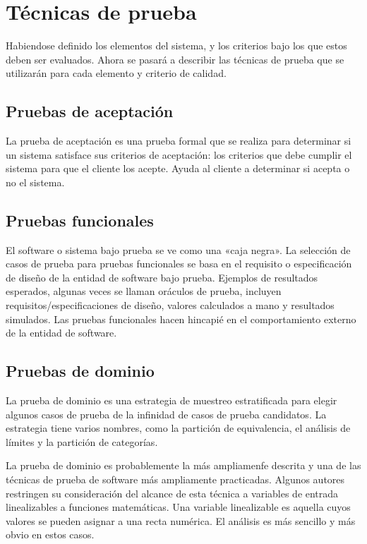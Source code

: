 \section{Técnicas de prueba}
Habiendose definido los elementos del sistema, y los criterios bajo los que
estos deben ser evaluados. Ahora se pasará a describir las técnicas de prueba
que se utilizarán para cada elemento y criterio de calidad.

\subsection{Pruebas de aceptación}
La prueba de aceptación es una prueba formal que se realiza para determinar si
un sistema satisface sus criterios de aceptación: los criterios que debe cumplir
el sistema para que el cliente los acepte. Ayuda al cliente a determinar si
acepta o no el sistema\cite{Naik}.

\subsection{Pruebas funcionales}
El software o sistema bajo prueba se ve como una «caja negra». La selección de
casos de prueba para pruebas funcionales se basa en el requisito o
especificación de diseño de la entidad de software bajo prueba. Ejemplos de
resultados esperados, algunas veces se llaman oráculos de prueba, incluyen
requisitos/especificaciones de diseño, valores calculados a mano y resultados
simulados. Las pruebas funcionales hacen hincapié en el comportamiento externo
de la entidad de software\cite{Luo}.

\subsection{Pruebas de dominio}
La prueba de dominio es una estrategia de muestreo estratificada para elegir
algunos casos de prueba de la infinidad de casos de prueba candidatos. La
estrategia tiene varios nombres, como la partición de equivalencia, el análisis
de límites y la partición de categorías.

La prueba de dominio es probablemente la más ampliamenfe descrita y una de las
técnicas de prueba de software más ampliamente practicadas. Algunos autores
restringen su consideración del alcance de esta técnica a variables de entrada
linealizables a funciones matemáticas. Una variable linealizable es aquella
cuyos valores se pueden asignar a una recta numérica. El análisis es más
sencillo y más obvio en estos casos\cite{Kaner}.

